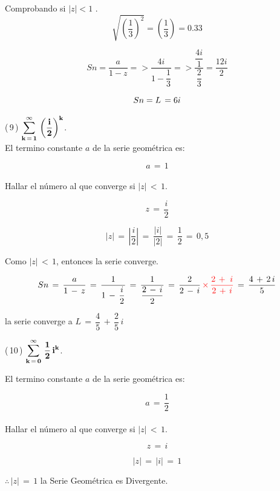 \documentclass[a4paper,11pt,openany]{book}
\begin{document}
\providecommand{\abs}[1]{\lvert#1\rvert} 

Comprobando si $\abs{z} < 1$
.\\

$$\sqrt{\left( \dfrac{1}{3} \right)^{2}}= \left( \dfrac{1}{3} \right) = 0.33$$

$$ Sn = \dfrac{a}{1-z} => \dfrac{4i}{1-\dfrac{1}{3}} => \dfrac{\dfrac{4i}{1}}{\dfrac{2}{3}} = \dfrac{12i}{2}$$

$$ Sn = \mathnormal{L}\,= 6i $$

\textcolor{ao(english)}{(\,9\,)} $\bf{\displaystyle\sum\limits_{k\,=\,1}^{\infty}\,\left(\dfrac{i}{2}\right)^{k}}$.\\

\textcolor{ao(english)}{} El termino constante $a$ de la serie geométrica es:

$$a\,=\,1$$\\

\textcolor{ao(english)}{} Hallar el número al que converge si $|z|\,<\,1$.

$$z\,=\,\dfrac{i}{2}$$

$$|z|\,=\,\left|\dfrac{i}{2}\right|\,=\,\dfrac{|i|}{|2|}\,=\,\dfrac{1}{2}\,=\,0,5$$

\textcolor{ao(english)}{} Como $|z|\,<\,1$, entonces la serie converge.

$$Sn\,=\,\dfrac{a}{1\,-\,z}\,=\,\dfrac{1}{1\,-\,\dfrac{i}{2}}\,=\,\dfrac{1}{\dfrac{2\,-\,i}{2}}\,=\,\dfrac{2}{2\,-\,i}\,\textcolor{red}{\times\,\dfrac{2\,+\,\,i}{2\,+\,i}}\,=\,\dfrac{4\,+\,2\,i}{5}$$

la serie converge a $L\,=\,\dfrac{4}{5}\,+\,\dfrac{2}{5}\,i$


\textcolor{ao(english)}{(\,10\,)} $\bf{\displaystyle\sum\limits_{k\,=\,0}^{\infty}\,\dfrac{1}{2}\,i^{k}}$.


\textcolor{ao(english)}{} El termino constante $a$ de la serie geométrica es:

$$a\,=\,\dfrac{1}{2}$$\\

\textcolor{ao(english)}{} Hallar el número al que converge si $|z|\,<\,1$.

$$z\,=\,i$$

$$|z|\,=\,|i|\,=\,1$$



$\therefore\,|z|\,=\,1$ la Serie Geométrica es Divergente.\\
\end{document}
